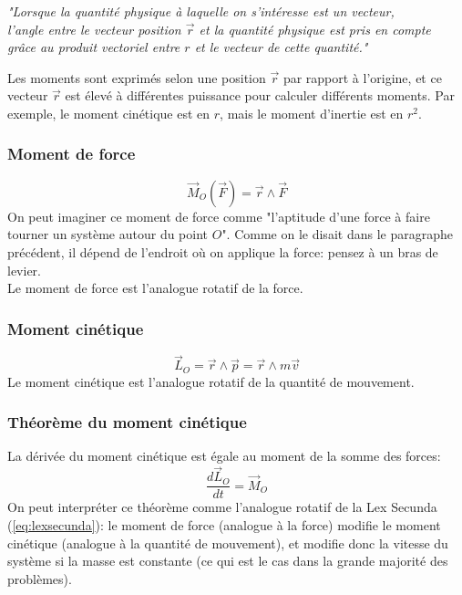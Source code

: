 \documentclass{article}
\numberwithin{equation}{section}
\begin{document}
\begin{center}
	\emph{"Lorsque la quantité physique à laquelle on s'intéresse est un vecteur, \\ l'angle entre le vecteur position \(\vec r\) et la quantité physique est pris en compte \\ grâce au produit vectoriel entre \(r\) et le vecteur de cette quantité."}
\end{center}

Les moments sont exprimés selon une position \(\vec r\) par rapport à l'origine, et ce vecteur \(\vec r\) est élevé à différentes puissance pour calculer différents moments. Par exemple, le moment cinétique est en \(r\), mais le moment d'inertie est en \(r^2\).

\subsubsection{Moment de force}
\begin{equation}
	\boxed{ \vec M_O ( \vec F ) = \vec r \wedge \vec F }
\end{equation}
On peut imaginer ce moment de force comme "l'aptitude d'une force à faire tourner un système autour du point \(O\)". Comme on le disait dans le paragraphe précédent, il dépend de l'endroit où on applique la force: pensez à un bras de levier. \\

Le moment de force est l'analogue rotatif de la force.

\subsubsection{Moment cinétique}
\begin{equation}
	\boxed{ \vec L_O = \vec r \wedge \vec p = \vec r \wedge m \vec v }
\end{equation}
Le moment cinétique est l'analogue rotatif de la quantité de mouvement.

\subsubsection{Théorème du moment cinétique}
La dérivée du moment cinétique est égale au moment de la somme des forces:
\begin{equation} \label{eq:thmmomentcinetique}
	\boxed{ \frac{d \vec L_O }{dt} = \vec M_O }
\end{equation}
On peut interpréter ce théorème comme l'analogue rotatif de la Lex Secunda (\ref{eq:lexsecunda}): le moment de force (analogue à la force) modifie le moment cinétique (analogue à la quantité de mouvement), et modifie donc la vitesse du système si la masse est constante (ce qui est le cas dans la grande majorité des problèmes).
\end{document}
